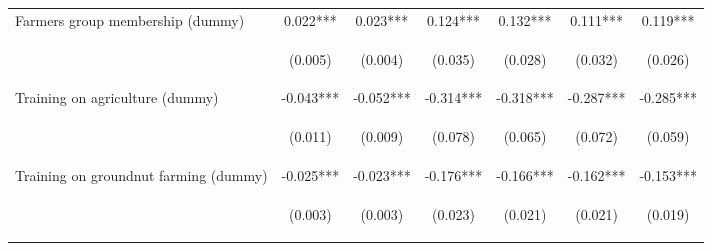 \begin{center}
\begin{tabular}{lcccccc}
Farmers group membership (dummy) & 0.022*** & 0.023*** & 0.124*** & 0.132*** & 0.111*** & 0.119*** \\
\vspace{4pt} & \begin{footnotesize}(0.005)\end{footnotesize} & \begin{footnotesize}(0.004)\end{footnotesize} & \begin{footnotesize}(0.035)\end{footnotesize} & \begin{footnotesize}(0.028)\end{footnotesize} & \begin{footnotesize}(0.032)\end{footnotesize} & \begin{footnotesize}(0.026)\end{footnotesize} \\
Training on agriculture (dummy) & -0.043*** & -0.052*** & -0.314*** & -0.318*** & -0.287*** & -0.285*** \\
\vspace{4pt} & \begin{footnotesize}(0.011)\end{footnotesize} & \begin{footnotesize}(0.009)\end{footnotesize} & \begin{footnotesize}(0.078)\end{footnotesize} & \begin{footnotesize}(0.065)\end{footnotesize} & \begin{footnotesize}(0.072)\end{footnotesize} & \begin{footnotesize}(0.059)\end{footnotesize} \\
Training on groundnut farming (dummy) & -0.025*** & -0.023*** & -0.176*** & -0.166*** & -0.162*** & -0.153*** \\
\vspace{4pt} & \begin{footnotesize}(0.003)\end{footnotesize} & \begin{footnotesize}(0.003)\end{footnotesize} & \begin{footnotesize}(0.023)\end{footnotesize} & \begin{footnotesize}(0.021)\end{footnotesize} & \begin{footnotesize}(0.021)\end{footnotesize} & \begin{footnotesize}(0.019)\end{footnotesize} \\

\end{tabular}
\end{center}
